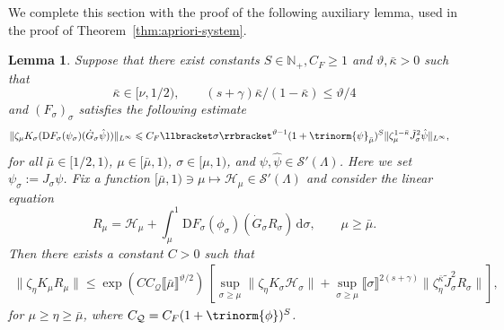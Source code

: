 \documentclass{article}
\numberwithin{equation}{section}
\newcommand{\assign}{:=}
\newcommand{\mathD}{\mathrm{D}}
\newcommand{\mathd}{\mathrm{d}}
\theoremstyle{plain}
\newtheorem{lemma}[theorem]{Lemma}
\theoremstyle{definition}
\begin{document}
We complete this section with the proof of the following auxiliary lemma, used
in the proof of Theorem~\ref{thm:apriori-system}.

\begin{lemma}
  \label{lem:weighted-gronwall}Suppose that there exist constants $S \in
  \mathbb{N}_+, C_F \geqslant 1$ and $\vartheta, \bar{\kappa} > 0$ such that
  \[ \bar{\kappa} \in [\nu, 1/2), \qquad (s + \gamma)  \bar{\kappa} / (1 -
     \bar{\kappa}) \leqslant \vartheta / 4 \]
  and $(F_{\sigma})_{\sigma}$ satisfies the following estimate
  \begin{equation}
    \begin{aligned}
      \| \zeta_{\mu} K_{\sigma} (\mathD F_{\sigma} (\psi_{\sigma})
      (\dot{G}_{\sigma}  \hat{\psi})) \|_{L^{\infty}} & \leqslant C_F 
      \llbracket \sigma \rrbracket^{\vartheta - 1}  (1 + \trinorm{ \psi
      }_{\bar{\mu}})^S  \| \zeta^{1 - \bar{\kappa}}_{\mu}
      \tilde{J}_{\sigma}^2 \hat{\psi} \|_{L^{\infty}},
    \end{aligned} \label{eq:est-DF}
  \end{equation}
  for all $\bar{\mu} \in [1 / 2, 1)$, $\mu \in [\bar{\mu}, 1)$, $\sigma \in [\mu,
  1)$, and $\psi, \hat{\psi} \in \mathcal{S}' (\Lambda)$. Here we set
  $\psi_{\sigma} \assign J_{\sigma} \psi$. Fix a function
  $[\bar{\mu}, 1) \ni \mu \mapsto \mathcal{H}_{\mu} \in \mathcal{S}'
  (\Lambda)$ and consider the linear equation
  \begin{equation}
    R_{\mu} =\mathcal{H}_{\mu} + \int_{\mu}^1 \mathD F_{\sigma}
    (\phi_{\sigma}) (\dot{G}_{\sigma} R_{\sigma})\,\mathd \sigma, \qquad \mu
    \geqslant \bar{\mu} . \label{eq:lin-R}
  \end{equation}
  Then there exists a constant $C > 0$ such that
  \begin{equation}
    \begin{aligned}
      \| \zeta_{\eta} K_{\mu} R_{\mu} \|
      \leqslant \exp (C C_{\mathcal{Q}}
      \llbracket \bar{\mu} \rrbracket^{\vartheta / 2})
      \,
      \left[\sup_{\sigma \geqslant \mu}
      \| \zeta_{\eta} K_{\sigma} \mathcal{H}_{\sigma} \|
      + \sup_{\sigma \geqslant \mu}
      \llbracket \sigma \rrbracket^{2 (s + \gamma)}
      \| \zeta_{\eta}^{\bar{\kappa}} \tilde{J}_{\sigma}^2 R_{\sigma} \|\right],
    \end{aligned}
    \label{eq:gronwall}
  \end{equation}
  for
  $\mu \geqslant \eta \geqslant \bar{\mu}$,
  where $C_{\mathcal{Q}} = C_F  (1 + \trinorm{ \phi })^S$.
\end{lemma}
\end{document}
